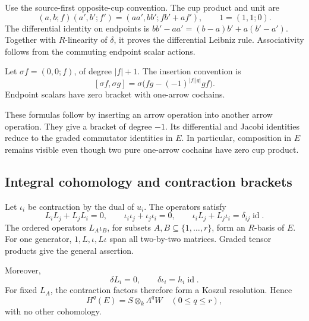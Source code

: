 Use the source-first opposite-cup convention.
The cup product and unit are
\begin{equation}\label{v4-arith:centers:eq:parameter-cup}
 (a,b;f)(a',b';f')=(aa',bb';fb'+af'),
 \qquad 1=(1,1;0).
\end{equation}
The differential identity on endpoints is
$bb'-aa'=(b-a)b'+a(b'-a')$.
Together with $R$-linearity of $\delta$, it
proves the differential Leibniz rule.
Associativity follows from the commuting
endpoint scalar actions.

Let $\sigma f=(0,0;f)$, of degree $|f|+1$.
The insertion convention is
\begin{equation}\label{v4-arith:centers:eq:parameter-bracket}
 [\sigma f,\sigma g]
 =\sigma\bigl(fg-(-1)^{|f||g|}gf\bigr).
\end{equation}
Endpoint scalars have zero bracket with
one-arrow cochains.

These formulas follow
by inserting an arrow operation into
another arrow operation. They give a
bracket of degree $-1$. Its differential
and Jacobi identities reduce to the
graded commutator identities in $E$.
In particular, composition in $E$ remains
visible even though two pure one-arrow
cochains have zero cup product.

\subsection{Integral cohomology and contraction brackets}
\label{v4-arith:centers:subsec:integral-parameter}

Let $\iota_i$ be contraction by the dual of
$u_i$. The operators satisfy
\[
 L_iL_j+L_jL_i=0,\qquad
 \iota_i\iota_j+\iota_j\iota_i=0,\qquad
 \iota_iL_j+L_j\iota_i=\delta_{ij}\operatorname{id}.
\]
The ordered operators $L_A\iota_B$, for
subsets $A,B\subseteq\{1,\ldots,r\}$, form
an $R$-basis of $E$. For one generator,
$1,L,\iota,L\iota$ span all two-by-two
matrices. Graded tensor products give
the general assertion.

Moreover,
\[
 \delta L_i=0,\qquad
 \delta\iota_i=h_i\operatorname{id}.
\]
For fixed $L_A$, the contraction factors
therefore form a Koszul resolution. Hence
\begin{equation}\label{v4-arith:centers:eq:end-parameter}
 H^q(E)=S\otimes_k\Lambda^qW\quad(0\leq q\leq r),
\end{equation}
with no other cohomology.

